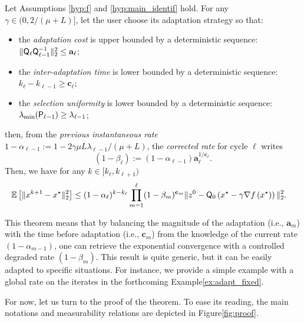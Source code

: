 \begin{theorem}\label{th:conv_nondis_arbitrary}
Let Assumptions \ref{hyp:f} and  \ref{hyp:main_identif} hold.  For any $\gamma\in(0,2/(\mu+L)]$, let the user choose its adaptation strategy so that:
\begin{itemize}
    \item  the \emph{adaptation cost} is upper bounded by a deterministic sequence:  $ \|  {\mathsf{Q}}_\ell   {\mathsf{Q}}_{\ell-1}^{-1} \|_2^2 \leq \mathbf{a}_\ell $;
    \item the \emph{inter-adaptation time} is lower bounded by a deterministic sequence: $k_{\ell}-k_{\ell-1}\geq \mathbf{c}_\ell$;
    \item the \emph{selection uniformity} is lower bounded by a deterministic sequence: $\lambda_{ \min}({\mathsf{P}}_{\ell-1}) \geq \lambda_{\ell-1} $;
\end{itemize}
then, from the \emph{previous instantaneous rate} $1-\alpha_{\ell-1}  := 1 -  2\gamma \mu L \lambda_{\ell-1}/(\mu + L)  $, the \emph{corrected rate} for cycle $\ell$ writes  
\begin{equation}\label{eq:corr-rate}
(1-\beta_\ell) := (1-\alpha_{\ell-1})\mathbf{a}_\ell^{1/\mathbf{c}_\ell}. 
\end{equation}
Then, we have for any $k\in [k_\ell,k_{\ell+1})$
\begin{align*}
    \EE\left[\|x^{k+1}-x^\star\|_2^2\right] &\leq (1-\alpha_\ell)^{k-k_\ell} \prod_{m=1}^\ell (1-\beta_m)^{\mathbf{c}_m}  \|z^{0}-\bQ_0\left(x^\star - \gamma\nabla f\left(x^\star\right)\right)\|_2^2. %
\end{align*}
\end{theorem}

{This theorem means that by balancing the magnitude of the adaptation (i.e., \;$\mathbf{a}_m$) with the time before adaptation (i.e., \;$\mathbf{c}_m$) from the knowledge of the current rate $(1-\alpha_{m-1})$, one can retrieve the exponential convergence with a controlled degraded rate $(1-\beta_m)$. 
This result is quite generic, but it can be easily adapted to specific situations.
For instance, we provide a simple example with a global rate on the iterates in the forthcoming Example\;\ref{ex:adapt_fixed}.

For now, let us turn to the proof of the theorem. To ease its reading, the main notations and measurability relations are depicted in Figure\;\ref{fig:proof}.

}

